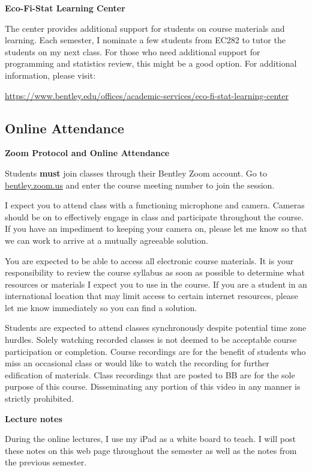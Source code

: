 \documentclass[
]{book}
\begin{document}
\textbf{Eco-Fi-Stat Learning Center}

The center provides additional support for students on course materials and learning. Each semester, I nominate a few students from EC282 to tutor the students on my next class. For those who need additional support for programming and statistics review, this might be a good option. For additional information, please visit:

\url{https://www.bentley.edu/offices/academic-services/eco-fi-stat-learning-center}

\hypertarget{online-attendance}{%
\subsection*{Online Attendance}\label{online-attendance}}

\textbf{Zoom Protocol and Online Attendance}

Students \textbf{must} join classes through their Bentley Zoom account. Go to \href{https://bentley.zoom.us}{bentley.zoom.us} and enter the course meeting number to join the session.

I expect you to attend class with a functioning microphone and camera. Cameras should be on to effectively engage in class and participate throughout the course. If you have an impediment to keeping your camera on, please let me know so that we can work to arrive at a mutually agreeable solution.

You are expected to be able to access all electronic course materials. It is your responsibility to review the course syllabus as soon as possible to determine what resources or materials I expect you to use in the course. If you are a student in an international location that may limit access to certain internet resources, please let me know immediately so you can find a solution.

Students are expected to attend classes synchronously despite potential time zone hurdles. Solely watching recorded classes is not deemed to be acceptable course participation or completion. Course recordings are for the benefit of students who miss an occasional class or would like to watch the recording for further edification of materials. Class recordings that are posted to BB are for the sole purpose of this course. Disseminating any portion of this video in any manner is strictly prohibited.

\textbf{Lecture notes}

During the online lectures, I use my iPad as a white board to teach. I will post these notes on this web page throughout the semester as well as the notes from the previous semester.
\end{document}
